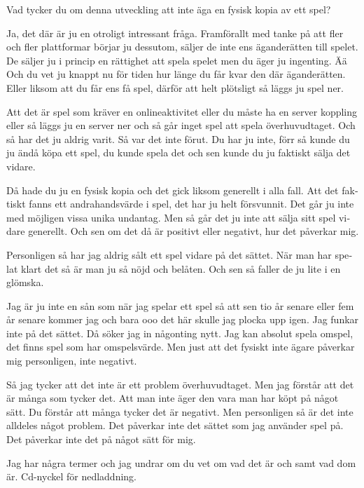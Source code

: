 \documentclass[11p]{article}
\begin{document}
\begin{otherlanguage}{swedish}
        \setlength{\leftskip}{0cm}
        Vad tycker du om denna utveckling att inte äga en fysisk kopia av ett spel?

        \setlength{\leftskip}{1cm}

        Ja, det där är ju en otroligt intressant fråga.
        Framförallt med tanke på att fler och fler plattformar börjar ju dessutom, säljer de inte ens äganderätten till spelet.
        De säljer ju i princip en rättighet att spela spelet men du äger ju ingenting. Ää Och du vet ju knappt nu för tiden hur länge du får kvar den där äganderätten.
        Eller liksom att du får ens få spel, därför att helt plötsligt så läggs ju spel ner.

        Att det är spel som kräver en onlineaktivitet eller du måste ha en server koppling eller så läggs ju en server ner och så går inget spel att spela överhuvudtaget. Och så har det ju aldrig varit.
        Så var det inte förut. Du har ju inte, förr så kunde du ju ändå köpa ett spel, du kunde spela det och sen kunde du ju faktiskt sälja det vidare.

        Då hade du ju en fysisk kopia och det gick liksom generellt i alla fall. Att det faktiskt fanns ett andrahandsvärde i spel, det har ju helt försvunnit.
        Det går ju inte med möjligen vissa unika undantag. Men så går det ju inte att sälja sitt spel vidare generellt.
        Och sen om det då är positivt eller negativt, hur det påverkar mig.

        Personligen så har jag aldrig sålt ett spel vidare på det sättet.
        När man har spelat klart det så är man ju så nöjd och belåten. Och sen så faller de ju lite i en glömska.

        Jag är ju inte en sån som när jag spelar ett spel så att sen tio år senare eller fem år senare kommer jag och bara ooo det här skulle jag plocka upp igen. Jag funkar inte på det sättet. Då söker jag in någonting nytt. Jag kan absolut spela omspel, det finns spel som har omspelsvärde.
        Men just att det fysiskt inte ägare påverkar mig personligen, inte negativt.

        Så jag tycker att det inte är ett problem överhuvudtaget. Men jag förstår att det är många som tycker det.
        Att man inte äger den vara man har köpt på något sätt. Du förstår att många tycker det är negativt. Men personligen så är det inte alldeles något problem.
        Det påverkar inte det sättet som jag använder spel på. Det påverkar inte det på något sätt för mig.


        \setlength{\leftskip}{0cm}
        Jag har några termer och jag undrar om du vet om vad det är och samt vad dom är.
        Cd-nyckel för nedladdning.



\end{otherlanguage}
\end{document}
